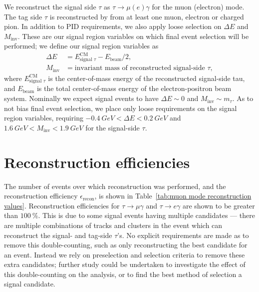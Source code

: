 \documentclass[12pt]{thesis}  %
\begin{document}
We reconstruct the signal side $\tau$ as $\tau \to \mu (e) \gamma$ for the muon (electron) mode. The tag side $\tau$ is reconstructed by from at least one muon, electron or charged pion. In addition to PID requirements, we also apply loose selection on $\Delta E$ and $M_{\text{inv}}$. These are our signal region variables on which final event selection will be performed; we define our signal region variables as
\begin{align}
\Delta E &= E^{\text{CM}}_{\text{signal }\tau} - E_{\text{beam}}/2,\\
M_{\text{inv}} &= \text{invariant mass of reconstructed signal-side $\tau$},
\end{align}
where $E^{\text{CM}}_{\text{signal }\tau}$ is the center-of-mass energy of the reconstructed signal-side tau, and $E_{\text{beam}}$ is the total center-of-mass energy of the electron-positron beam system. Nominally we expect signal events to have $\Delta E\sim 0$ and $M_{\text{inv}}\sim m_{\tau}$. As to not bias final event selection, we place only loose requirements on the signal region variables, requiring $\SI{-0.4}{GeV} < \Delta E < \SI{0.2}{GeV}$ and $\SI{1.6}{GeV} < M_{\text{inv}} < \SI{1.9}{GeV}$ for the signal-side $\tau$. 

\section{Reconstruction efficiencies}

The number of events over which reconstruction was performed, and the reconstruction efficiency $\epsilon_{\text{recon}}$, is shown in Table~\ref{tab:muon mode reconstruction values}. Reconstruction efficiencies for $\tau\to\mu\gamma$ and $\tau\to e\gamma$ are shown to be greater than $\SI{100}{\percent}$. This is due to some signal events having multiple candidates --- there are multiple combinations of tracks and clusters in the event which can reconstruct the signal- and tag-side $\tau$'s. No explicit requirements are made as to remove this double-counting, such as only reconstructing the best candidate for an event. Instead we rely on preselection and selection criteria to remove these extra candidates; further study could be undertaken to investigate the effect of this double-counting on the analysis, or to find the best method of selection a signal candidate.
\end{document}
